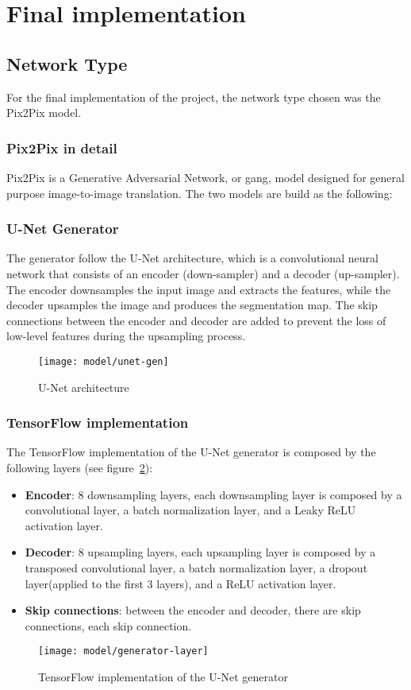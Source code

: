 \section{Final implementation}\label{sec:final-implementation}
\subsection{Network Type}\label{subsec:network-type}
For the final implementation of the project, the network type chosen was the Pix2Pix model.
\subsubsection{Pix2Pix in detail}\label{subsubsec:pix2pix-in-detail}
Pix2Pix is a Generative Adversarial Network, or \gls{gang}, model designed for general purpose image-to-image translation.
The two models are build as the following:
\subsubsection{U-Net Generator}
The generator follow the U-Net architecture, which is a convolutional neural network that
consists of an encoder (down-sampler) and a decoder (up-sampler). The encoder downsamples the
input image and extracts the features, while the decoder upsamples the image and produces
the segmentation map. The skip connections between the encoder and decoder are added to
prevent the loss of low-level features during the upsampling process.
\begin{figure}[H]
    \centering
    \texttt{[image: model/unet-gen]}
    \caption{U-Net architecture}\label{fig:unet}
\end{figure}
\subsubsection{TensorFlow implementation}
The TensorFlow implementation of the U-Net generator is composed by the following layers (see figure~\ref{fig:gen-layer}):
\begin{itemize}
    \item \textbf{Encoder}: 8 downsampling layers, each downsampling layer is composed by a convolutional layer, a batch normalization layer, and a Leaky ReLU activation layer.
    \item \textbf{Decoder}: 8 upsampling layers, each upsampling layer is composed by a transposed convolutional layer, a batch normalization layer, a dropout layer(applied to the first 3 layers), and a ReLU activation layer.
    \item \textbf{Skip connections}: between the encoder and decoder, there are skip connections, each skip connection.
\end{itemize}
\begin{figure}[H]
    \centering
    \texttt{[image: model/generator-layer]}
    \caption{TensorFlow implementation of the U-Net generator}\label{fig:gen-layer}
\end{figure}
